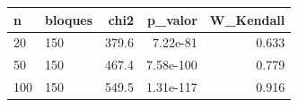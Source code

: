 \begin{tabular}{llrrr}
\toprule
n & bloques & chi2 & p\_valor & W\_Kendall \\
\midrule
20 & 150 & 379.6 & 7.22e-81 & 0.633 \\
\midrule
50 & 150 & 467.4 & 7.58e-100 & 0.779 \\
\midrule
100 & 150 & 549.5 & 1.31e-117 & 0.916 \\
\bottomrule
\end{tabular}
